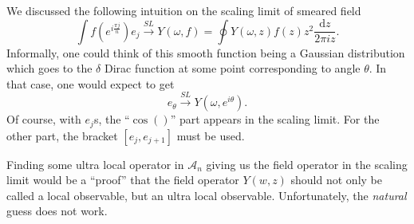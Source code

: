 \documentclass[twoside,11pt,titlepage]{amsart}
\renewcommand{\=}[1]{\stackrel{#1}{=}} %
\theoremstyle{definition}
\theoremstyle{remark}
\begin{document}
We discussed the following intuition on the scaling limit of smeared field
$$\int f(e^{i\frac{\pi j}{n}})e_j \xrightarrow{SL} Y(\omega,f)=\oint Y(\omega,z)f(z)z^2 \frac{\text{d}z}{2\pi i z}.$$
Informally, one could think of this smooth function being a Gaussian distribution which goes to the $\delta$ Dirac function at some point corresponding to angle $\theta$. In that case, one would expect to get
$$e_\theta \xrightarrow{SL} Y(\omega,e^{i\theta}).$$
Of course, with $e_j$s, the ``$\cos()$'' part appears in the scaling limit. For the other part, the bracket $[e_j,e_{j+1}]$ must be used.

Finding some ultra local operator in $\mathcal{A}_n$ giving us the field operator in the scaling limit would be a ``proof'' that the field operator $Y(w,z)$ should not only be called a local observable, but an ultra local observable. Unfortunately, the \textit{natural} guess does not work.
\end{document}
